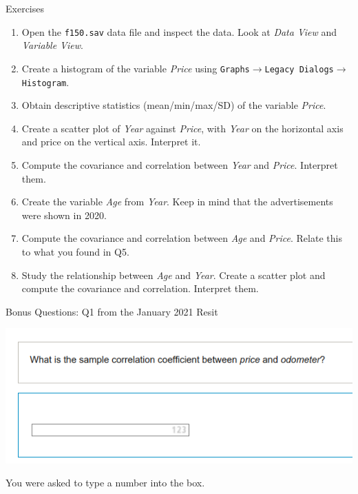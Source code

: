\documentclass[11pt]{beamer}
\begin{document}
\begin{frame}{Exercises}
  \begin{enumerate}
    \item Open the \texttt{f150.sav} data file and inspect the data. Look at \emph{Data View} and \emph{Variable View}.
    \item Create a histogram of the variable \emph{Price} using \texttt{Graphs}$\rightarrow$\texttt{Legacy Dialogs}$\rightarrow$\texttt{Histogram}.
    \item Obtain descriptive statistics (mean/min/max/SD) of the variable \emph{Price}.
    \item Create a scatter plot of \emph{Year} against \emph{Price}, with \emph{Year} on the horizontal axis and price on the vertical axis. Interpret it.
    \item Compute the covariance and correlation between \emph{Year} and \emph{Price}. Interpret them.
    \item Create the variable \emph{Age} from \emph{Year}. Keep in mind that the advertisements were shown in 2020.
    \item Compute the covariance and correlation between \emph{Age} and \emph{Price}. Relate this to what you found in Q5.
    \item Study the relationship between \emph{Age} and \emph{Year}. Create a scatter plot and compute the covariance and correlation. Interpret them.
  \end{enumerate}
\end{frame}

\begin{frame}{Bonus Questions: Q1 from the January 2021 Resit}
  \begin{center}
    \includegraphics[width=\textwidth]{f150-exam-q1.png}
  \end{center}
  You were asked to type a number into the box.
\end{frame}
\end{document}

